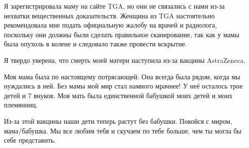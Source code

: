 Я зарегистрировала маму на сайте TGA, но они не связались с нами из-за нехватки
вещественных доказательств. Женщина из TGA настоятельно рекомендовала мне подать
официальную жалобу на врачей и радиолога, поскольку они должны были сделать
правильное сканирование, так как у мамы была опухоль в колене и следовало также
провести вскрытие.

Я твердо уверена, что смерть моей матери наступила из-за вакцины AstraZeneca.

Моя мама была по настоящему потрясающей. Она всегда была рядом, когда мы
нуждались в ней. Без мамы мой мир стал намного мрачнее! У неё осталось трое
детей и 7 внуков. Моя мать была единственной бабушкой моих детей и моих
племянниц.

Из-за этой вакцины наши дети теперь растут без бабушки. Покойся с миром,
мама/бабушка. Мы все любим тебя и скучаем по тебе больше, чем ты могла бы себе
представить.
